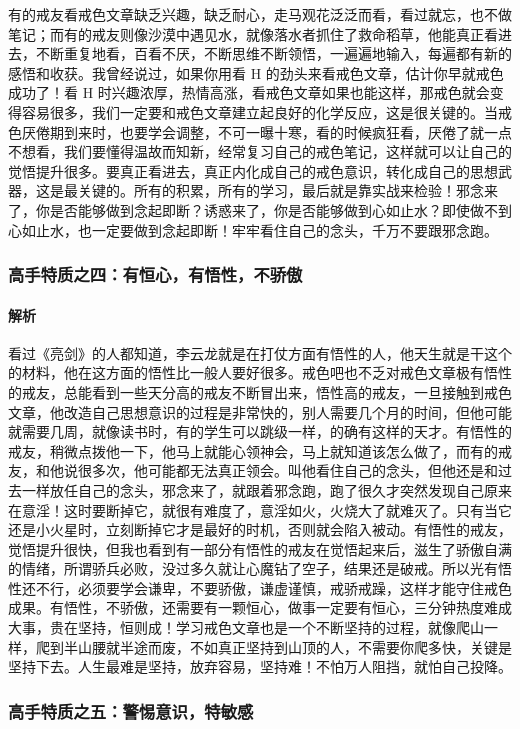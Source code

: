\documentclass{ctexart}
\begin{document}
有的戒友看戒色文章缺乏兴趣，缺乏耐心，走马观花泛泛而看，看过就忘，也不做笔记；而有的戒友则像沙漠中遇见水，就像落水者抓住了救命稻草，他能真正看进去，不断重复地看，百看不厌，不断思维不断领悟，一遍遍地输入，每遍都有新的感悟和收获。我曾经说过，如果你用看 H 的劲头来看戒色文章，估计你早就戒色成功了！看 H 时兴趣浓厚，热情高涨，看戒色文章如果也能这样，那戒色就会变得容易很多，我们一定要和戒色文章建立起良好的化学反应，这是很关键的。当戒色厌倦期到来时，也要学会调整，不可一曝十寒，看的时候疯狂看，厌倦了就一点不想看，我们要懂得温故而知新，经常复习自己的戒色笔记，这样就可以让自己的觉悟提升很多。要真正看进去，真正内化成自己的戒色意识，转化成自己的思想武器，这是最关键的。所有的积累，所有的学习，最后就是靠实战来检验！邪念来了，你是否能够做到念起即断？诱惑来了，你是否能够做到心如止水？即使做不到心如止水，也一定要做到念起即断！牢牢看住自己的念头，千万不要跟邪念跑。

\subsubsection{高手特质之四：有恒心，有悟性，不骄傲}

\paragraph{解析} 看过《亮剑》的人都知道，李云龙就是在打仗方面有悟性的人，他天生就是干这个的材料，他在这方面的悟性比一般人要好很多。戒色吧也不乏对戒色文章极有悟性的戒友，总能看到一些天分高的戒友不断冒出来，悟性高的戒友，一旦接触到戒色文章，他改造自己思想意识的过程是非常快的，别人需要几个月的时间，但他可能就需要几周，就像读书时，有的学生可以跳级一样，的确有这样的天才。有悟性的戒友，稍微点拨他一下，他马上就能心领神会，马上就知道该怎么做了，而有的戒友，和他说很多次，他可能都无法真正领会。叫他看住自己的念头，但他还是和过去一样放任自己的念头，邪念来了，就跟着邪念跑，跑了很久才突然发现自己原来在意淫！这时要断掉它，就很有难度了，意淫如火，火烧大了就难灭了。只有当它还是小火星时，立刻断掉它才是最好的时机，否则就会陷入被动。有悟性的戒友，觉悟提升很快，但我也看到有一部分有悟性的戒友在觉悟起来后，滋生了骄傲自满的情绪，所谓骄兵必败，没过多久就让心魔钻了空子，结果还是破戒。所以光有悟性还不行，必须要学会谦卑，不要骄傲，谦虚谨慎，戒骄戒躁，这样才能守住戒色成果。有悟性，不骄傲，还需要有一颗恒心，做事一定要有恒心，三分钟热度难成大事，贵在坚持，恒则成！学习戒色文章也是一个不断坚持的过程，就像爬山一样，爬到半山腰就半途而废，不如真正坚持到山顶的人，不需要你爬多快，关键是坚持下去。人生最难是坚持，放弃容易，坚持难！不怕万人阻挡，就怕自己投降。

\subsubsection{高手特质之五：警惕意识，特敏感}
\end{document}
